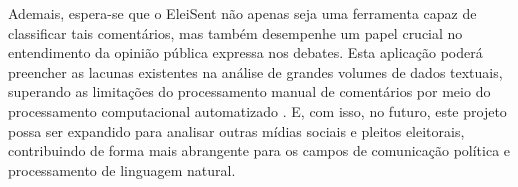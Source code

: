 \documentclass[
	12pt,				%
	openright,			%
	oneside,			%
	a4paper,			%
	english,			%
	brazil				%
	]{abntex2}
\begin{document}
Ademais, espera-se que o EleiSent não apenas seja uma ferramenta capaz de classificar tais comentários, mas também desempenhe um papel crucial no entendimento da opinião pública expressa nos debates. Esta aplicação poderá preencher as lacunas existentes na análise de grandes volumes de dados textuais, superando as limitações do processamento manual de comentários por meio do processamento computacional automatizado \cite{Munger2025}. E, com isso, no futuro, este projeto possa ser expandido para analisar outras mídias sociais e pleitos eleitorais, contribuindo de forma mais abrangente para os campos de comunicação política e processamento de linguagem natural.
\postextual


\end{document}
